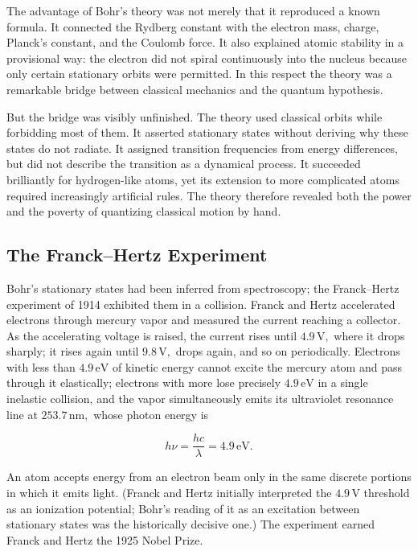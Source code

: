 The advantage of Bohr's theory was not merely that it reproduced a known formula. It connected the Rydberg constant with the electron mass, charge, Planck's constant, and the Coulomb force. It also explained atomic stability in a provisional way: the electron did not spiral continuously into the nucleus because only certain stationary orbits were permitted. In this respect the theory was a remarkable bridge between classical mechanics and the quantum hypothesis.

But the bridge was visibly unfinished. The theory used classical orbits while forbidding most of them. It asserted stationary states without deriving why these states do not radiate. It assigned transition frequencies from energy differences, but did not describe the transition as a dynamical process. It succeeded brilliantly for hydrogen-like atoms, yet its extension to more complicated atoms required increasingly artificial rules. The theory therefore revealed both the power and the poverty of quantizing classical motion by hand.

\subsection{The Franck--Hertz Experiment}
Bohr's stationary states had been inferred from spectroscopy; the Franck--Hertz experiment of 1914 exhibited them in a collision. Franck and Hertz accelerated electrons through mercury vapor and measured the current reaching a collector. As the accelerating voltage is raised, the current rises until $4.9\,\mathrm{V},$ where it drops sharply; it rises again until $9.8\,\mathrm{V},$ drops again, and so on periodically. Electrons with less than $4.9\,\mathrm{eV}$ of kinetic energy cannot excite the mercury atom and pass through it elastically; electrons with more lose precisely $4.9\,\mathrm{eV}$ in a single inelastic collision, and the vapor simultaneously emits its ultraviolet resonance line at $253.7\,\mathrm{nm},$ whose photon energy is
\begin{linenomath}
    \begin{equation}
        h\nu=\frac{hc}{\lambda}=4.9\,\mathrm{eV}.
    \end{equation}
\end{linenomath}
An atom accepts energy from an electron beam only in the same discrete portions in which it emits light. (Franck and Hertz initially interpreted the $4.9\,\mathrm{V}$ threshold as an ionization potential; Bohr's reading of it as an excitation between stationary states was the historically decisive one.) The experiment earned Franck and Hertz the 1925 Nobel Prize.


